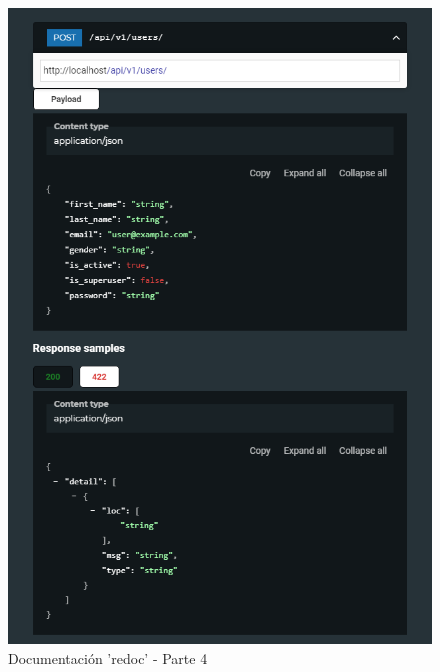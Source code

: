 \begin{figure}[!htb]
    \centering
    \includegraphics[scale=.40]{TT/img/implementacion/redoc_4.png}
    \caption{Documentación 'redoc' - Parte 4}
    \label{graphic:redoc4}
\end{figure}
